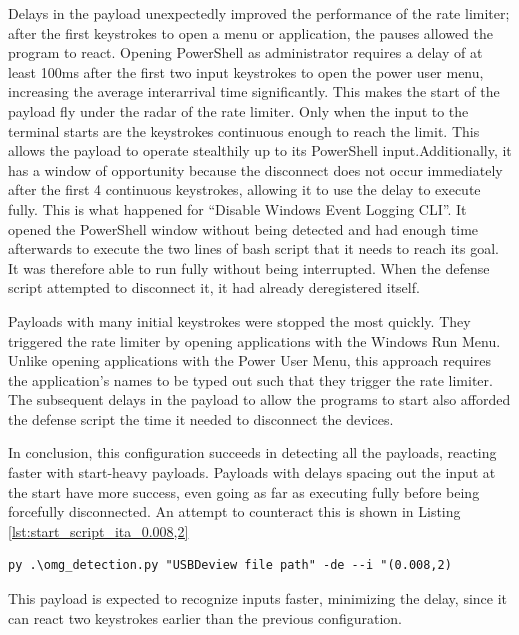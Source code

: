 Delays in the payload unexpectedly improved the performance of the rate limiter; after the first keystrokes to open a menu or application, the pauses allowed the program to react. Opening PowerShell as administrator requires a delay of at least 100ms after the first two input keystrokes to open the power user menu, increasing the average interarrival time significantly. This makes the start of the payload fly under the radar of the rate limiter. Only when the input to the terminal starts are the keystrokes continuous enough to reach the limit. This allows the payload to operate stealthily up to its PowerShell input.Additionally, it has a window of opportunity because the disconnect does not occur immediately after the first 4 continuous keystrokes, allowing it to use the delay to execute fully. This is what happened for ``Disable Windows Event Logging CLI''. It opened the PowerShell window without being detected and had enough time afterwards to execute the two lines of bash script that it needs to reach its goal. It was therefore able to run fully without being interrupted. When the defense script attempted to disconnect it, it had already deregistered itself. 

Payloads with many initial keystrokes were stopped the most quickly. They triggered the rate limiter by opening applications with the Windows Run Menu. Unlike opening applications with the Power User Menu, this approach requires the application's names to be typed out such that they trigger the rate limiter. The subsequent delays in the payload to allow the programs to start also afforded the defense script the time it needed to disconnect the devices.  

In conclusion, this configuration succeeds in detecting all the payloads, reacting faster with start-heavy payloads. Payloads with delays spacing out the input at the start have more success, even going as far as executing fully before being forcefully disconnected. An attempt to counteract this is shown in Listing  \ref{lst:start_script_ita_0.008,2}   

\begin{lstlisting}[caption={start Defense Script with ITA (0.02,2)},label={lst:start_script_ita_0.008,2}, captionpos=b]
 py .\omg_detection.py "USBDeview file path" -de --i "(0.008,2)
\end{lstlisting}

This payload is expected to recognize inputs faster, minimizing the delay, since it can react two keystrokes earlier than the previous configuration. 

